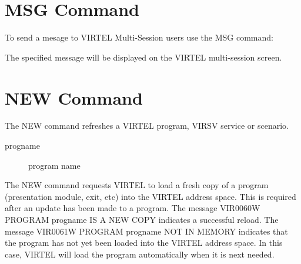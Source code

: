 \documentclass[letterpaper,10pt,english]{sphinxmanual}
\begin{document}
\newpage


\section{MSG Command}
\label{\detokenize{audit_operations_ and_performance:index-14}}\label{\detokenize{audit_operations_ and_performance:msg-command}}
To send a mesage to VIRTEL Multi-Session users use the MSG command:

\begin{sphinxVerbatim}[commandchars=\\\{\}]
 
\end{sphinxVerbatim}

The specified message will be displayed on the VIRTEL multi-session screen.


\section{NEW Command}
\label{\detokenize{audit_operations_ and_performance:new-command}}\label{\detokenize{audit_operations_ and_performance:index-15}}
The NEW command refreshes a VIRTEL program, VIRSV service or scenario.

\begin{sphinxVerbatim}[commandchars=\\\{\}]
\end{sphinxVerbatim}
\begin{description}
\item[{progname}] \leavevmode
program name

\end{description}

The NEW command requests VIRTEL to load a fresh copy of a program  (presentation module, exit, etc) into the VIRTEL address space. This is required after an update has been made to a program. The message     VIR0060W PROGRAM progname IS A NEW COPY indicates a successful reload. The message VIR0061W PROGRAM progname NOT IN MEMORY indicates that the program has not yet been loaded into the VIRTEL address space. In this case, VIRTEL will load the program automatically when it is next needed.

\end{document}
